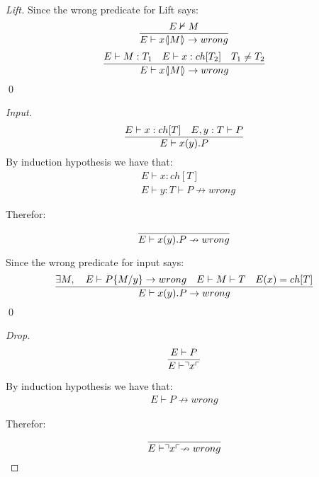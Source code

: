 \begin{theorem}
\begin{proof}[Lift]
        Since the wrong predicate for Lift says:
        \begin{align*}
            \frac{E \nvdash M}{E \vdash x \langle \! | M | \! \rangle \rightarrow wrong}
        \end{align*}
        \begin{align*}
            \frac{E \vdash M:T_1 \quad E \vdash x:ch[T_2] \quad T_1 \neq T_2}{E \vdash x \langle \! | M | \! \rangle \rightarrow wrong}
        \end{align*}
        \qed
    \end{proof}

    \begin{proof}[Input]
        \begin{align*}
            \frac{E \vdash x:ch[T] \quad E,y:T \vdash P}{E \vdash x(y).P}
        \end{align*}
        By induction hypothesis we have that:
        \begin{align*}
            &E \vdash x:ch[T]\\
            &E \vdash y:T \vdash P \nrightarrow wrong
        \end{align*}

        Therefor:
        \begin{align*}
            \frac{}{E \vdash x(y).P \nrightarrow wrong}
        \end{align*}

        Since the wrong predicate for input says:
        \begin{align*}
            \frac{\exists M, \quad E \vdash P\{M/y\}\rightarrow wrong \quad E\vdash M\vdash T \quad E(x)=ch[T]}{E \vdash x(y).P \rightarrow wrong}
        \end{align*}
        \qed
    \end{proof}

    \begin{proof}[Drop]
        \begin{align*}
            \frac{E \vdash P}{E \vdash \urcorner x \ulcorner}
        \end{align*}

        By induction hypothesis we have that:
        \begin{align*}
            E \vdash P \nrightarrow wrong
        \end{align*}

        Therefor:
        \begin{align*}
            \frac{}{E \vdash \urcorner x \ulcorner \nrightarrow wrong}
        \end{align*}


\end{proof}
\end{theorem}
